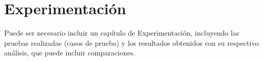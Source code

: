 \chapter{Experimentación}
Puede ser necesario incluir un capítulo de Experimentación, incluyendo las pruebas realizadas (casos de prueba) y los resultados obtenidos con su respectivo análisis, que puede incluir comparaciones. 